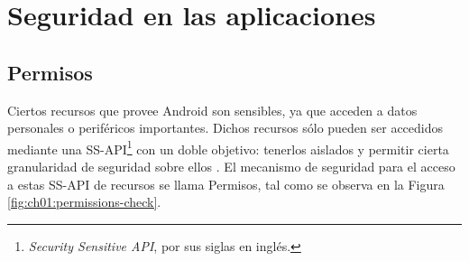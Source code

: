 \section{Seguridad en las aplicaciones}
\subsection{Permisos} \label{ch01-permisos}
Ciertos recursos que provee Android son sensibles, ya que acceden a datos personales o periféricos importantes. Dichos recursos sólo pueden ser accedidos mediante una SS-API\footnote{\textit{Security Sensitive API}, por sus siglas en inglés.} con un doble objetivo: tenerlos aislados y permitir cierta granularidad de seguridad sobre ellos \cite{HYGZD2014}. El mecanismo de seguridad para el acceso a estas SS-API de recursos se llama Permisos, tal como se observa en la Figura \ref{fig:ch01:permissions-check}.\\


